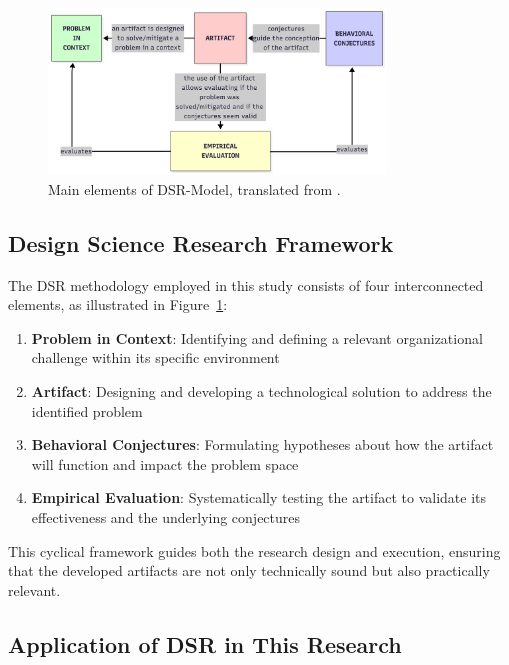     \begin{figure}[h]
    \centering
    \includegraphics[width=0.8\textwidth]{images/dsr-model.png}
    \caption{Main elements of DSR-Model, translated from \citet{Oswald2023}.}
    \label{fig:dsr-model}
    \end{figure}
    
    \subsection{Design Science Research Framework}
    
        The DSR methodology employed in this study consists of four interconnected elements, as illustrated in Figure~\ref{fig:dsr-model}:
        
        \begin{enumerate}
        \item \textbf{Problem in Context}: Identifying and defining a relevant organizational challenge within its specific environment
        \item \textbf{Artifact}: Designing and developing a technological solution to address the identified problem
        \item \textbf{Behavioral Conjectures}: Formulating hypotheses about how the artifact will function and impact the problem space
        \item \textbf{Empirical Evaluation}: Systematically testing the artifact to validate its effectiveness and the underlying conjectures
        \end{enumerate}
        
        This cyclical framework guides both the research design and execution, ensuring that the developed artifacts are not only technically sound but also practically relevant.
    
    \subsection{Application of DSR in This Research} \label{sec:dsr-application}
        
